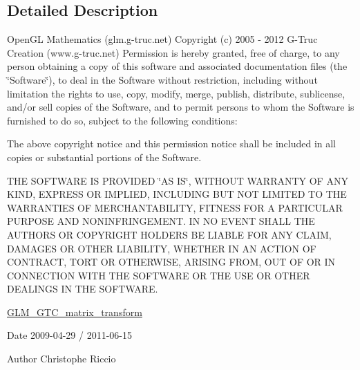 \subsection{Detailed Description}
Open\-G\-L Mathematics (glm.\-g-\/truc.\-net) Copyright (c) 2005 -\/ 2012 G-\/\-Truc Creation (www.\-g-\/truc.\-net) Permission is hereby granted, free of charge, to any person obtaining a copy of this software and associated documentation files (the \char`\"{}\-Software\char`\"{}), to deal in the Software without restriction, including without limitation the rights to use, copy, modify, merge, publish, distribute, sublicense, and/or sell copies of the Software, and to permit persons to whom the Software is furnished to do so, subject to the following conditions\-:

The above copyright notice and this permission notice shall be included in all copies or substantial portions of the Software.

T\-H\-E S\-O\-F\-T\-W\-A\-R\-E I\-S P\-R\-O\-V\-I\-D\-E\-D \char`\"{}\-A\-S I\-S\char`\"{}, W\-I\-T\-H\-O\-U\-T W\-A\-R\-R\-A\-N\-T\-Y O\-F A\-N\-Y K\-I\-N\-D, E\-X\-P\-R\-E\-S\-S O\-R I\-M\-P\-L\-I\-E\-D, I\-N\-C\-L\-U\-D\-I\-N\-G B\-U\-T N\-O\-T L\-I\-M\-I\-T\-E\-D T\-O T\-H\-E W\-A\-R\-R\-A\-N\-T\-I\-E\-S O\-F M\-E\-R\-C\-H\-A\-N\-T\-A\-B\-I\-L\-I\-T\-Y, F\-I\-T\-N\-E\-S\-S F\-O\-R A P\-A\-R\-T\-I\-C\-U\-L\-A\-R P\-U\-R\-P\-O\-S\-E A\-N\-D N\-O\-N\-I\-N\-F\-R\-I\-N\-G\-E\-M\-E\-N\-T. I\-N N\-O E\-V\-E\-N\-T S\-H\-A\-L\-L T\-H\-E A\-U\-T\-H\-O\-R\-S O\-R C\-O\-P\-Y\-R\-I\-G\-H\-T H\-O\-L\-D\-E\-R\-S B\-E L\-I\-A\-B\-L\-E F\-O\-R A\-N\-Y C\-L\-A\-I\-M, D\-A\-M\-A\-G\-E\-S O\-R O\-T\-H\-E\-R L\-I\-A\-B\-I\-L\-I\-T\-Y, W\-H\-E\-T\-H\-E\-R I\-N A\-N A\-C\-T\-I\-O\-N O\-F C\-O\-N\-T\-R\-A\-C\-T, T\-O\-R\-T O\-R O\-T\-H\-E\-R\-W\-I\-S\-E, A\-R\-I\-S\-I\-N\-G F\-R\-O\-M, O\-U\-T O\-F O\-R I\-N C\-O\-N\-N\-E\-C\-T\-I\-O\-N W\-I\-T\-H T\-H\-E S\-O\-F\-T\-W\-A\-R\-E O\-R T\-H\-E U\-S\-E O\-R O\-T\-H\-E\-R D\-E\-A\-L\-I\-N\-G\-S I\-N T\-H\-E S\-O\-F\-T\-W\-A\-R\-E.

\hyperlink{group__gtc__matrix__transform}{G\-L\-M\-\_\-\-G\-T\-C\-\_\-matrix\-\_\-transform}

\begin{DoxyDate}{Date}
2009-\/04-\/29 / 2011-\/06-\/15 
\end{DoxyDate}
\begin{DoxyAuthor}{Author}
Christophe Riccio 
\end{DoxyAuthor}

